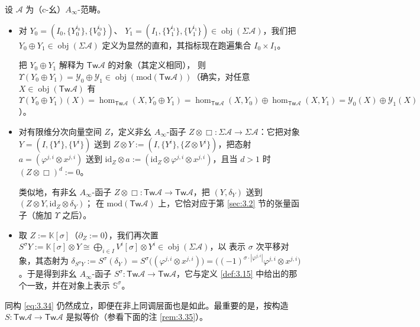 \begin{Def}\label{def:3.33}
设 $\mathcal A$ 为（c-幺）$A_\infty$-范畴。
\begin{itemize}
  \item 对 $Y_0=(I_0,\{Y_0^{i_0}\},\{V_0^{i_0}\})$、
        $Y_1=(I_1,\{Y_1^{i_1}\},\{V_1^{i_1}\})\in\operatorname{obj}
        (\Sigma\mathcal A)$，我们把 $Y_0\oplus Y_1\in\operatorname{obj}
        (\Sigma\mathcal A)$ 定义为显然的直和，其指标现在跑遍集合
        $I_0\times I_1$。

        把 $Y_0\oplus Y_1$ 解释为 $\mathsf{Tw}\mathcal A$ 的对象（其定义相同），
        则 $\Upsilon(Y_0\oplus Y_1)=\mathcal Y_0\oplus\mathcal Y_1\in
        \operatorname{obj}(\mathrm{mod}(\mathsf{Tw}\mathcal A))$（确实，对任意
        $X\in\operatorname{obj}(\mathsf{Tw}\mathcal A)$ 有
        $\Upsilon(Y_0\oplus Y_1)(X)=\hom_{\mathsf{Tw}\mathcal A}
        (X,Y_0\oplus Y_1)=\hom_{\mathsf{Tw}\mathcal A}(X,Y_0)\oplus
        \hom_{\mathsf{Tw}\mathcal A}(X,Y_1)=\mathcal Y_0(X)\oplus
        \mathcal Y_1(X)$）。
  \item 对有限维分次向量空间 $Z$，定义非幺 $A_\infty$-函子
        $Z\otimes\Box:\Sigma\mathcal A\to\Sigma\mathcal A$：它把对象
        $Y=(I,\{Y^i\},\{V^i\})$ 送到
        $Z\otimes Y:=(I,\{Y^i\},\{Z\otimes V^i\})$，把态射
        $a=(\varphi^{j,i}\otimes x^{j,i})$ 送到
        $\mathrm{id}_Z\otimes a:=(\mathrm{id}_Z\otimes\varphi^{j,i}\otimes
        x^{j,i})$，且当 $d>1$ 时 $(Z\otimes\Box)^d:=0$。

        类似地，有非幺 $A_\infty$-函子
        $Z\otimes\Box:\mathsf{Tw}\mathcal A\to\mathsf{Tw}\mathcal A$，把
        $(Y,\delta_Y)$ 送到 $(Z\otimes Y,\mathrm{id}_Z\otimes\delta_Y)$；
        在 $\mathrm{mod}(\mathsf{Tw}\mathcal A)$ 上，它恰对应于第
        \ref{sec:3.2} 节的张量函子（施加 $\Upsilon$ 之后）。
  \item 取 $Z:=\mathbb K[\sigma]$（$\partial_Z:=0$），我们再次置
        $S^\sigma Y:=\mathbb K[\sigma]\otimes Y\cong\bigoplus_{i\in I}
        V^i[\sigma]\otimes Y^i\in\operatorname{obj}(\Sigma\mathcal A)$，以
        表示 $\sigma$ 次平移对象，其态射为
        $\delta_{S^\sigma Y}:=S^\sigma(\delta_Y)=
        S^\sigma\bigl((\varphi^{j,i}\otimes x^{j,i})\bigr)=
        \bigl((-1)^{\sigma\cdot|\varphi^{j,i}|}\varphi^{j,i}\otimes
        x^{j,i}\bigr)$。于是得到非幺 $A_\infty$-函子
        $S^\sigma:\mathsf{Tw}\mathcal A\to\mathsf{Tw}\mathcal A$，它与定义
        \ref{def:3.15} 中给出的那个一致，并在对象上表示
        $\mathbb S^\sigma$。
\end{itemize}
同构 \eqref{eq:3.34} 仍然成立，即便在非上同调层面也是如此。最重要的是，按构造
$S:\mathsf{Tw}\mathcal A\to\mathsf{Tw}\mathcal A$ 是拟等价（参看下面的注
\ref{rem:3.35}）。
\end{Def}

